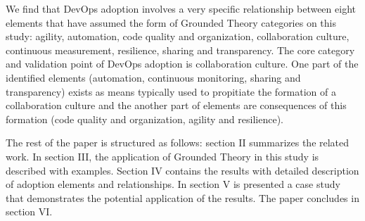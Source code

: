 We find that DevOps adoption involves a very specific relationship between
eight elements that have assumed the form of Grounded Theory categories on
this study: agility, automation, code quality and organization, collaboration
culture, continuous measurement, resilience, sharing and transparency. The
core category and validation point of DevOps adoption is collaboration culture.
One part of the identified elements (automation, continuous monitoring, sharing
and transparency) exists as means typically used to propitiate the formation
of a collaboration culture and the another part of elements are consequences
of this formation (code quality and organization, agility and resilience).

The rest of the paper is structured as follows: section II summarizes the
related work. In section III, the application of Grounded Theory in this study
is described with examples. Section IV contains the results with detailed
description of adoption elements and relationships. In section V is presented
a case study that demonstrates the potential application of the results. The
paper concludes in section VI.
